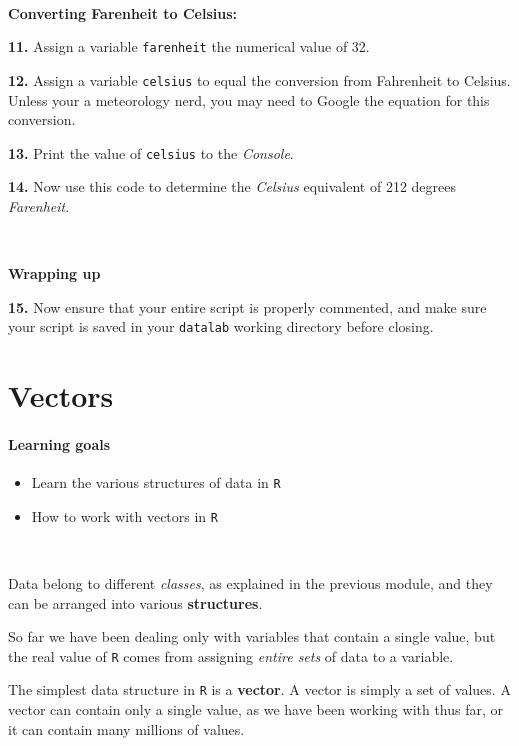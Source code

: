 \documentclass[
]{book}
\providecommand{\tightlist}{%
  \setlength{\itemsep}{0pt}\setlength{\parskip}{0pt}}
\begin{document}
~

\textbf{Converting Farenheit to Celsius:}

\textbf{11.} Assign a variable \texttt{farenheit} the numerical value of 32.

\textbf{12.} Assign a variable \texttt{celsius} to equal the conversion from Fahrenheit to Celsius. Unless your a meteorology nerd, you may need to Google the equation for this conversion.

\textbf{13.} Print the value of \texttt{celsius} to the \emph{Console}.

\textbf{14.} Now use this code to determine the \emph{Celsius} equivalent of 212 degrees \emph{Farenheit}.

~

\textbf{Wrapping up}

\textbf{15.} Now ensure that your entire script is properly commented, and make sure your script is saved in your \texttt{datalab} working directory before closing.

\hypertarget{vectors}{%
\chapter{Vectors}\label{vectors}}

\hypertarget{learning-goals-3}{%
\subsubsection*{Learning goals}\label{learning-goals-3}}

\begin{itemize}
\tightlist
\item
  Learn the various structures of data in \texttt{R}\\
\item
  How to work with vectors in \texttt{R}
\end{itemize}

~

Data belong to different \emph{classes}, as explained in the previous module, and they can be arranged into various \textbf{structures}.

So far we have been dealing only with variables that contain a single value, but the real value of \texttt{R} comes from assigning \emph{entire sets} of data to a variable.

The simplest data structure in \texttt{R} is a \textbf{vector}. A vector is simply a set of values. A vector can contain only a single value, as we have been working with thus far, or it can contain many millions of values.
\end{document}
